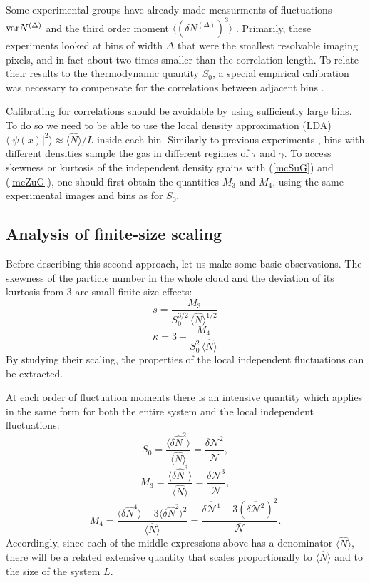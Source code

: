 \documentclass[aps,twocolumn,pra,superscriptaddress,nofootinbib,amsmath,amssymb,floats,floatfix,english]{revtex4-1}
\newcommand{\op}[1]{\widehat{#1}}
\newcommand{\mc}[1]{{\mathcal{#1}}}
\newcommand{\wb}[1]{{\overline{#1}}}
\newcommand{\eqn}[1]{(\ref{#1})}
\renewcommand{\eq}[2]{\begin{equation}\label{#1}#2\end{equation}}
\begin{document}
Some experimental groups have already made measurments  of fluctuations ${\rm var}N^{(\Delta)}$ \cite{Armijo10,Jacqmin11,Armijo11,Armijo12} and the third order moment $\langle(\delta N^{(\Delta)})^3\rangle$ \cite{Armijo10}. 
Primarily, these experiments looked at bins of width $\Delta$ that were the smallest resolvable imaging pixels, and in fact about two times smaller than the correlation length. 
To relate their results to the thermodynamic quantity $S_0$, a special empirical calibration was necessary to compensate for the correlations between adjacent bins \cite{Armijo10}. 

Calibrating for correlations should be avoidable by  using sufficiently large bins.
To do so we need to be able to use the local density approximation (LDA) $\langle|\psi(x)|^2\rangle\approx\langle\op{N}\rangle/L$ inside each bin.
Similarly to previous experiments \cite{vanAmerongen08,Armijo10,Jacqmin11}, bins 
with different densities sample the gas in different regimes of $\tau$ and $\gamma$.
To access skewness or kurtosis of the independent density grains with \eqn{mcSuG} and \eqn{mcZuG}, one should first obtain the quantities $M_3$ and $M_4$, using the same experimental images and bins as for $S_0$. 


\subsection{Analysis of finite-size scaling}
\label{OBS_FS}

Before describing this second approach, let us make some basic observations. 
The skewness of the particle number in the whole cloud and the deviation of its kurtosis from 3 are small finite-size effects:
\eq{fs3}{
s = \frac{M_3}{S_0^{3/2}\,\langle\op{N}\rangle^{1/2}}
}
\eq{fs4}{
\kappa = 3 + \frac{M_4}{S_0^2\,\langle\op{N}\rangle}
}
By studying their scaling, the properties of the local independent fluctuations can be extracted. 

At each order of fluctuation moments there is an intensive quantity which applies in the same form for both the entire system and the local independent fluctuations:
\eq{inte2}{
S_0 = \frac{\langle\delta\op{N}^2\rangle}{\langle\op{N}\rangle} = \frac{\wb{\delta\mc{N}^2}}{\wb{\mc{N}}},
}
\eq{inte3}{
M_3 = \frac{\langle\delta\op{N}^3\rangle}{\langle\op{N}\rangle} = \frac{\wb{\delta\mc{N}^3}}{\wb{\mc{N}}},
}
\eq{inte4}{
M_4 = \frac{\langle\delta\op{N}^4\rangle-3\langle\delta\op{N}^2\rangle^2}{\langle\op{N}\rangle} = \frac{\wb{\delta\mc{N}^4}-3\left(\wb{\delta\mc{N}^2}\right)^2}{\wb{\mc{N}}}.
}
Accordingly, since each of the middle expressions above has a denominator $\langle\op{N}\rangle$, 
there will be a related extensive quantity that scales proportionally to $\langle\op{N}\rangle$  
and to the size of the system $L$.
\end{document}
